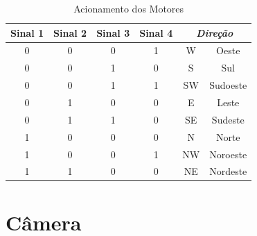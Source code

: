 \begin{table}[h!]
    \centering
    \begin{tabular}{|c|c|c|c|c|c|} \hline
        \textbf{Sinal 1} & \textbf{Sinal 2} & \textbf{Sinal 3} & \textbf{Sinal 4} & \multicolumn{2}{|c|}{\textit{Direção}} \\ \hline
        0 & 0 & 0 & 1 & W & Oeste \\ \hline
        0 & 0 & 1 & 0 & S & Sul \\ \hline
        0 & 0 & 1 & 1 & SW & Sudoeste \\ \hline
        0 & 1 & 0 & 0 & E & Leste \\ \hline
        0 & 1 & 1 & 0 & SE & Sudeste \\ \hline
        1 & 0 & 0 & 0 & N & Norte \\ \hline
        1 & 0 & 0 & 1 & NW & Noroeste \\ \hline
        1 & 1 & 0 & 0 & NE & Nordeste \\ \hline
    \end{tabular}
    \caption{Acionamento dos Motores}
    \label{sen_tbl01}
\end{table}

\section{Câmera}
\label{sec_camera}
